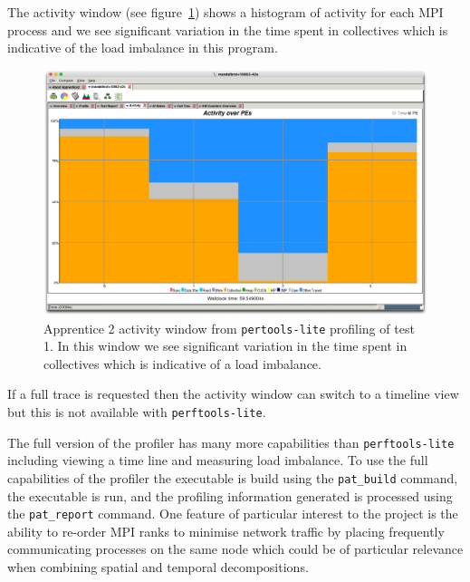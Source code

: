 \documentclass[a4paper,titlepage]{article}
\begin{document}
The activity window (see figure~\ref{fig:app2_activity}) shows a histogram of activity for each MPI process and we see significant variation in the time spent in collectives which is indicative of the load imbalance in this program.
\begin{figure}[htbp]
\begin{center}
\includegraphics[scale=0.3]{figures/app2_activity}
\caption{Apprentice 2 activity window from \texttt{pertools-lite} profiling of test 1. In this window we see significant variation in the time spent in collectives which is indicative of a load imbalance.}
\label{fig:app2_activity}
\end{center}
\end{figure}
If a full trace is requested then the activity window can switch to a timeline view but this is not available with \texttt{perftools-lite}.

The full version of the profiler has many more capabilities than \texttt{perftools-lite} including viewing a time line and measuring load imbalance. To use the full capabilities of the profiler the executable is build using the \verb+pat_build+ command, the executable is run, and the profiling information generated is processed using the \verb+pat_report+ command. One feature of particular interest to the project is the ability to re-order MPI ranks to minimise network traffic by placing frequently communicating processes on the same node which could be of particular relevance when combining spatial and temporal decompositions. 

\pagebreak

\end{document}
